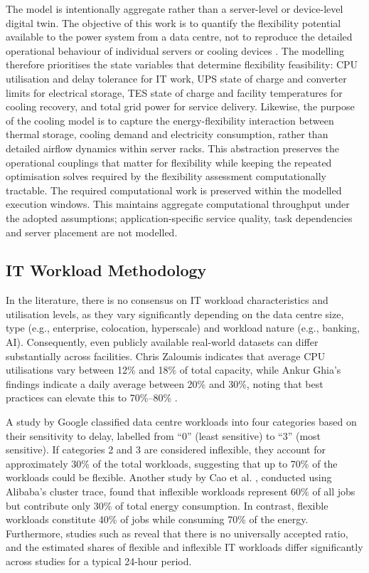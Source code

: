\documentclass[lettersize,journal]{IEEEtran}
\newcommand{\rev}[1]{#1}
\begin{document}
\rev{The model is intentionally aggregate rather than a server-level or device-level digital twin. The objective of this work is to quantify the flexibility potential available to the power system from a data centre, not to reproduce the detailed operational behaviour of individual servers or cooling devices \cite{barroso2018datacenter,dayarathna2015data}. The modelling therefore prioritises the state variables that determine flexibility feasibility: CPU utilisation and delay tolerance for IT work, UPS state of charge and converter limits for electrical storage, TES state of charge and facility temperatures for cooling recovery, and total grid power for service delivery. Likewise, the purpose of the cooling model is to capture the energy-flexibility interaction between thermal storage, cooling demand and electricity consumption, rather than detailed airflow dynamics within server racks. This abstraction preserves the operational couplings that matter for flexibility while keeping the repeated optimisation solves required by the flexibility assessment computationally tractable. The required computational work is preserved within the modelled execution windows. This maintains aggregate computational throughput under the adopted assumptions; application-specific service quality, task dependencies and server placement are not modelled.}

\label{sec: methodology}
\subsection{IT Workload Methodology}
 
In the literature, there is no consensus on IT workload characteristics and utilisation levels, as they vary significantly depending on the data centre size, type (e.g., enterprise, colocation, hyperscale) and workload nature (e.g., banking, AI). Consequently, even publicly available real-world datasets can differ substantially across facilities. Chris Zaloumis \cite{Zaloumis2022IBM} indicates that average CPU utilisations vary between 12\% and 18\% of total capacity, while Ankur Ghia's findings indicate a daily average between 20\% and 30\%, noting that best practices can elevate this to 70\%--80\% \cite{Ghia2011McKinsey}. 
 
 A study by Google \cite{6779441} classified data centre workloads into four categories based on their sensitivity to delay, labelled from ``0'' (least sensitive) to ``3'' (most sensitive). If categories 2 and 3 are considered inflexible, they account for approximately 30\% of the total workloads, suggesting that up to 70\% of the workloads could be flexible. Another study by Cao et al. \cite{Cao2022ApEn}, conducted using Alibaba’s cluster trace, found that inflexible workloads represent 60\% of all jobs but contribute only 30\% of total energy consumption. In contrast, flexible workloads constitute 40\% of jobs while consuming 70\% of the energy. Furthermore, studies such as \cite{Misaghian2023TIA,Xu2023SPIE,Zhou2024IJEPES,Fu2020ApEn,Liu2012PER} reveal that there is no universally accepted ratio, and the estimated shares of flexible and inflexible IT workloads differ significantly across studies for a typical 24-hour period. 
\end{document}
